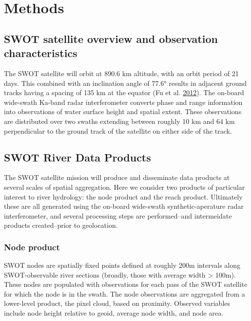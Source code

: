 \documentclass[]{book}
\begin{document}
\hypertarget{methods}{%
\chapter{Methods}\label{methods}}

\hypertarget{swot-satellite-overview-and-observation-characteristics}{%
\section{SWOT satellite overview and observation characteristics}\label{swot-satellite-overview-and-observation-characteristics}}

The SWOT satellite will orbit at 890.6 km altitude, with an orbit period of 21 days. This combined with an inclination angle of 77.6° results in adjacent ground tracks having a spacing of 135 km at the equator (Fu et al. \protect\hyperlink{ref-fu2012swot}{2012}). The on-board wide-swath Ka-band radar interferometer converts phase and range information into observations of water surface height and spatial extent. These observations are distributed over two swaths extending between roughly 10 km and 64 km perpendicular to the ground track of the satellite on either side of the track.

\hypertarget{swot-river-data-products}{%
\section{SWOT River Data Products}\label{swot-river-data-products}}

The SWOT satellite mission will produce and disseminate data products at several scales of spatial aggregation. Here we consider two products of particular interest to river hydrology: the node product and the reach product. Ultimately these are all generated using the on-board wide-swath synthetic-aperature radar interferometer, and several processing steps are performed--and intermeidate products created--prior to geolocation.

\hypertarget{node-product}{%
\subsection{Node product}\label{node-product}}

SWOT nodes are spatially fixed points defined at roughly 200m intervals along SWOT-observable river sections (broadly, those with average width \textgreater{} 100m). These nodes are populated with observations for each pass of the SWOT satellite for which the node is in the swath. The node observations are aggregated from a lower-level product, the pixel cloud, based on proximity. Observed variables include node height relative to geoid, average node width, and node area.
\end{document}
